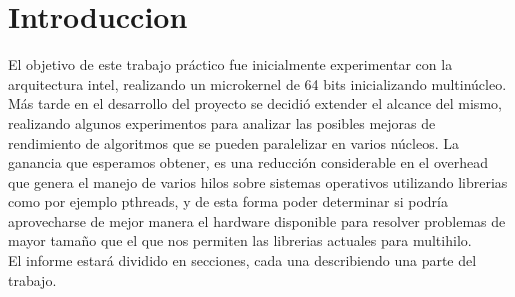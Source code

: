 \section{Introduccion}
    El objetivo de este trabajo práctico fue inicialmente experimentar con la arquitectura intel, realizando un microkernel de 64 bits inicializando multinúcleo. Más tarde en el desarrollo del proyecto se decidió extender el alcance del mismo, realizando algunos experimentos para analizar las posibles mejoras de rendimiento de algoritmos que se pueden paralelizar en varios núcleos. La ganancia que esperamos obtener, es una reducción considerable en el overhead que genera el manejo de varios hilos sobre sistemas operativos utilizando librerias como por ejemplo pthreads, y de esta forma poder determinar si podría aprovecharse de mejor manera el hardware disponible para resolver problemas de mayor tamaño que el que nos permiten las librerias actuales para multihilo.
    \\

    El informe estará dividido en secciones, cada una describiendo una parte del trabajo.
